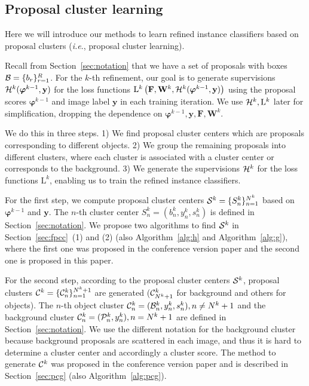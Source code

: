 \documentclass[10pt,journal,compsoc]{IEEEtran}
\def\ie{\emph{i.e}.} \def\Ie{\emph{I.e}.}
\begin{document}
\subsection{Proposal cluster learning}
\label{sec:pcl}

Here we will introduce our methods to learn refined instance classifiers based on proposal clusters (\ie, proposal cluster learning).

Recall from Section~\ref{sec:notation} that we have a set of proposals with boxes ${\cal B} = \{b_{r}\}_{r=1}^{R}$.
For the $k$-th refinement,
our goal is to generate supervisions ${\cal H}^{k}(\bm{\varphi}^{k-1}, \mathbf{y})$ for the loss functions $\mathrm{L}^{k}\left(\mathbf{F}, \mathbf{W}^{k}, {\cal H}^{k}(\bm{\varphi}^{k-1}, \mathbf{y})\right)$
using the proposal scores $\bm{\varphi}^{k-1}$ and image label $\mathbf{y}$
in each training iteration.
We use ${\cal H}^{k}, \mathrm{L}^{k}$ later for simplification, dropping the dependence on $\bm{\varphi}^{k-1}, \mathbf{y}, \mathbf{F}, \mathbf{W}^{k}$.

We do this in three steps.
1) We find proposal cluster centers which are proposals corresponding to different objects.
2) We group the remaining proposals into different clusters,
where each cluster is associated with a cluster center or corresponds to the background.
3) We generate the supervisions ${\cal H}^{k}$ for the loss functions $\mathrm{L}^{k}$,
enabling us to train the refined instance classifiers.

For the first step,
we compute proposal cluster centers ${\cal S}^{k} = \{S^{k}_{n}\}_{n=1}^{N^{k}}$
based on $\bm{\varphi}^{k-1}$ and $\mathbf{y}$.
The $n$-th cluster center $S^{k}_{n} = (b^{k}_{n}, y^{k}_{n}, s^{k}_{n})$ is defined in Section~\ref{sec:notation}.
We propose two algorithms to find ${\cal S}^{k}$ in Section~\ref{sec:fpcc}~(1) and (2) (also Algorithm~\ref{alg:h} and Algorithm~\ref{alg:g}),
where the first one was proposed in the conference version paper \cite{Ref:Tang2017multiple}
and the second one is proposed in this paper.

For the second step,
according to the proposal cluster centers ${\cal S}^{k}$,
proposal clusters ${\cal C}^{k} = \{{\cal C}^{k}_{n}\}_{n=1}^{N^{k}+1}$ are generated
(${\cal C}^{k}_{N^{k}+1}$ for background and others for objects).
The $n$-th object cluster ${\cal C}^{k}_{n} = ({\cal B}^{k}_{n}, y^{k}_{n}, s^{k}_{n}), n \neq N^{k}+1$
and the background cluster ${\cal C}^{k}_{n} = ({\cal P}^{k}_{n}, y^{k}_{n}), n = N^{k}+1$
are defined in Section~\ref{sec:notation}.
We use the different notation for the background cluster because background proposals are scattered in each image,
and thus it is hard to determine a cluster center and accordingly a cluster score.
The method to generate ${\cal C}^{k}$ was proposed in the conference version paper and is described in Section~\ref{sec:pcg} (also Algorithm~\ref{alg:pcg}).
\end{document}
